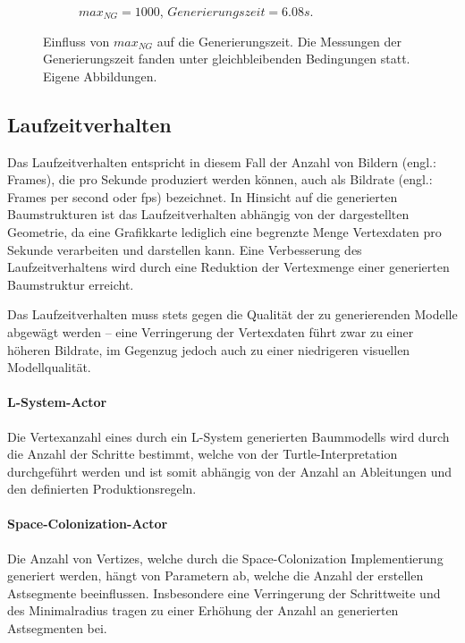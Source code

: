 \begin{figure} [hbtp]
\begin{subfigure}[t]{.45\textwidth}
		\caption{$max_{NG} = 1000$, $Generierungszeit = 6.08 s$.}
		\label{subfig:SCA_maxNG_1000}
	\end{subfigure}	
	\caption{Einfluss von $max_{NG}$ auf die Generierungszeit. Die Messungen der Generierungszeit fanden unter gleichbleibenden Bedingungen statt. Eigene Abbildungen.}
	\label{fig:SCA_maxNG}
\end{figure}

\subsection{Laufzeitverhalten}

Das Laufzeitverhalten entspricht in diesem Fall der Anzahl von Bildern (engl.: Frames), die pro Sekunde produziert werden können, auch als Bildrate (engl.: Frames per second oder fps) bezeichnet. In Hinsicht auf die generierten Baumstrukturen ist das Laufzeitverhalten abhängig von der dargestellten Geometrie, da eine Grafikkarte lediglich eine begrenzte Menge Vertexdaten pro Sekunde verarbeiten und darstellen kann. Eine Verbesserung des Laufzeitverhaltens wird durch eine Reduktion der Vertexmenge einer generierten Baumstruktur erreicht.

Das Laufzeitverhalten muss stets gegen die Qualität der zu generierenden Modelle abgewägt werden -- eine Verringerung der Vertexdaten führt zwar zu einer höheren Bildrate, im Gegenzug jedoch auch zu einer niedrigeren visuellen Modellqualität. \cite[S.5]{Deussen:05}

\paragraph{L-System-Actor}

Die Vertexanzahl eines durch ein L-System generierten Baummodells wird durch die Anzahl der Schritte bestimmt, welche von der Turtle-Interpretation durchgeführt werden und ist somit abhängig von der Anzahl an Ableitungen und den definierten Produktionsregeln. 

\paragraph{Space-Colonization-Actor}

Die Anzahl von Vertizes, welche durch die Space-Colonization Implementierung generiert werden, hängt von Parametern ab, welche die Anzahl der erstellen Astsegmente beeinflussen. Insbesondere eine Verringerung der Schrittweite und des Minimalradius tragen zu einer Erhöhung der Anzahl an generierten Astsegmenten bei.

